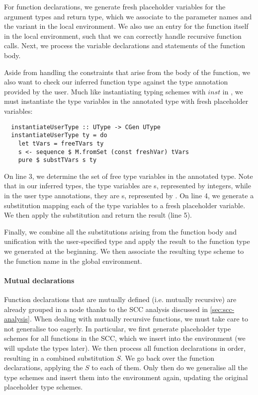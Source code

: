 For function declarations, we generate fresh placeholder variables for the
argument types and return type, which we associate to the parameter names and
the  variant in the local environment.
We also use an entry for the function itself in the local environment, such that
we can correctly handle recursive function calls.
Next, we process the variable declarations and statements of the function body.

Aside from handling the constraints that arise from the body of the function, we
also want to check our inferred function type against the type annotation
provided by the user.
Much like instantiating typing schemes with $\mathit{inst}$ in
, we must instantiate the type variables in the annotated
type with fresh placeholder variables:
\begin{verbatim}
  instantiateUserType :: UType -> CGen UType
  instantiateUserType ty = do
    let tVars = freeTVars ty
    s <- sequence $ M.fromSet (const freshVar) tVars
    pure $ substTVars s ty
\end{verbatim}
%
On line 3, we determine the set of free type variables in the annotated type.
Note that in our inferred types, the type variables are s,
represented by integers, while in the user type annotations, they are
s, represented by .
On line 4, we generate a substitution mapping each of the type variables to a
fresh placeholder variable. We then apply the substitution and return the result
(line 5).

Finally, we combine all the substitutions arising from the function body and
unification with the user-specified type and apply the result to the function
type we generated at the beginning. We then associate the resulting type scheme
to the function name in the global environment.

\paragraph{Mutual declarations}
Function declarations that are mutually defined (i.e. mutually recursive) are
already grouped in a  node thanks to the SCC analysis
discussed in \cref{sec:scc-analysis}.
When dealing with mutually recursive functions, we must take care to not
generalise too eagerly.
In particular, we first generate placeholder type schemes for all functions in
the SCC, which we insert into the environment (we will update the types later).
We then process all function declarations in order, resulting in a combined
substitution $S$. We go back over the function declarations, applying the $S$ to
each of them.
Only then do we generalise all the type schemes and insert them into the
environment again, updating the original placeholder type schemes.

